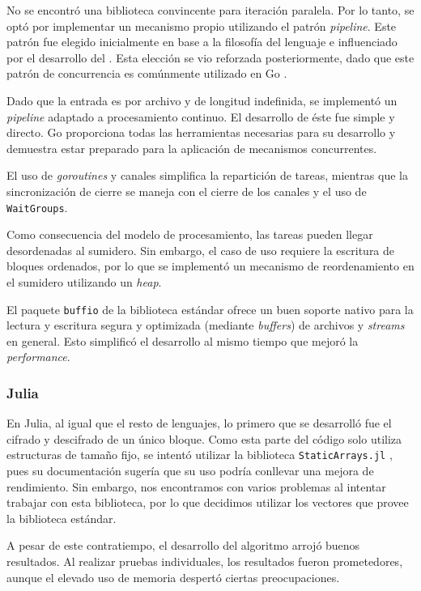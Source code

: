 \documentclass[11pt]{article}
\let\Oldsubsubsection\subsubsection
\renewcommand{\subsubsection}{\FloatBarrier\Oldsubsubsection}
\newcommand{\english}[1]{\textit{#1}}
\begin{document}
No se encontró una biblioteca convincente para iteración paralela. Por lo tanto, se optó por implementar un mecanismo propio utilizando el patrón \textit{pipeline}. Este patrón fue elegido inicialmente en base a la filosofía del lenguaje \cite{go:ex:sharing} e influenciado por el desarrollo del . Esta elección se vio reforzada posteriormente, dado que este patrón de concurrencia es comúnmente utilizado en Go \cite{go:ex:pipelines}.

Dado que la entrada es por archivo y de longitud indefinida, se implementó un \textit{pipeline} adaptado a procesamiento continuo. El desarrollo de éste fue simple y directo. Go proporciona todas las herramientas necesarias para su desarrollo y demuestra estar preparado para la aplicación de mecanismos concurrentes.

El uso de \textit{goroutines} y canales simplifica la repartición de tareas, mientras que la sincronización de cierre se maneja con el cierre de los canales y el uso de \lstinline{WaitGroups}.

Como consecuencia del modelo de procesamiento, las tareas pueden llegar desordenadas al sumidero. Sin embargo, el caso de uso requiere la escritura de bloques ordenados, por lo que se implementó un mecanismo de reordenamiento en el sumidero utilizando un \english{heap}.

El paquete \lstinline{buffio} de la biblioteca estándar ofrece un buen soporte nativo para la lectura y escritura segura y optimizada (mediante \english{buffers}) de archivos y \english{streams} en general. Esto simplificó el desarrollo al mismo tiempo que mejoró la \english{performance}.

\subsubsection{Julia}

En Julia, al igual que el resto de lenguajes, lo primero que se desarrolló fue el cifrado y descifrado de un único bloque. Como esta parte del código solo utiliza estructuras de tamaño fijo, se intentó utilizar la biblioteca \lstinline{StaticArrays.jl} \cite{jl:lib:staticarrays}, pues su documentación sugería que su uso podría conllevar una mejora de rendimiento. Sin embargo, nos encontramos con varios problemas al intentar trabajar con esta biblioteca, por lo que decidimos utilizar los vectores que provee la biblioteca estándar.

A pesar de este contratiempo, el desarrollo del algoritmo arrojó buenos resultados. Al realizar pruebas individuales, los resultados fueron prometedores, aunque el elevado uso de memoria despertó ciertas preocupaciones.
\end{document}
